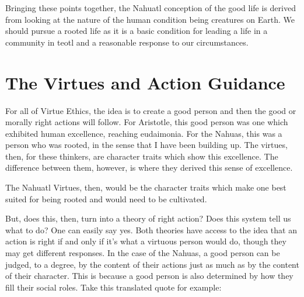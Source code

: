 Bringing these points together, the Nahuatl conception of the good life is derived from looking at the nature of the human condition being creatures on Earth. We should pursue a rooted life as it is a basic condition for leading a life in a community in teotl and a reasonable response to our circumstances.
\section{The Virtues and Action Guidance}

For all of Virtue Ethics, the idea is to create a good person and then the good or morally right actions will follow. For Aristotle, this good person was one which exhibited human excellence, reaching eudaimonia. For the Nahuas, this was a person who was rooted, in the sense that I have been building up.  The virtues, then, for these thinkers, are character traits which show this excellence. The difference between them, however, is where they derived this sense of excellence. 

The Nahuatl Virtues, then, would be the character traits which make one best suited for being rooted and would need to be cultivated. 


But, does this, then, turn into a theory of right action? Does this system tell us what to do? One can easily say yes. Both theories have access to the idea that an action is right if and only if it's what a virtuous person would do, though they may get different responses. In the case of the Nahuas, a good person can be judged, to a degree, by the content of their actions just as much as by the content of their character. This is because a good person is also determined by how they fill their social roles. Take this translated quote for example:


